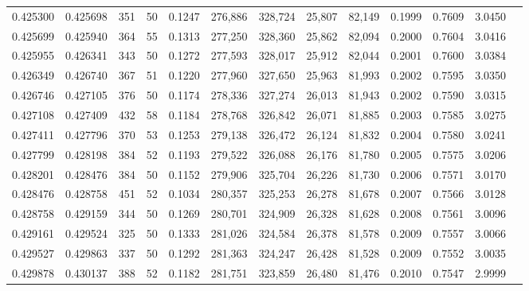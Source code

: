 \begin{tabular}{rrrrrrrrrrrrr}
0.425300 & 0.425698 &   351 &  50 &                                     0.1247 & 276,886 & 328,724 &  25,807 &  82,149 & 0.1999 & 0.7609 & 3.0450 \\
0.425699 & 0.425940 &   364 &  55 &                                     0.1313 & 277,250 & 328,360 &  25,862 &  82,094 & 0.2000 & 0.7604 & 3.0416 \\
0.425955 & 0.426341 &   343 &  50 &                                     0.1272 & 277,593 & 328,017 &  25,912 &  82,044 & 0.2001 & 0.7600 & 3.0384 \\
0.426349 & 0.426740 &   367 &  51 &                                     0.1220 & 277,960 & 327,650 &  25,963 &  81,993 & 0.2002 & 0.7595 & 3.0350 \\
0.426746 & 0.427105 &   376 &  50 &                                     0.1174 & 278,336 & 327,274 &  26,013 &  81,943 & 0.2002 & 0.7590 & 3.0315 \\
0.427108 & 0.427409 &   432 &  58 &                                     0.1184 & 278,768 & 326,842 &  26,071 &  81,885 & 0.2003 & 0.7585 & 3.0275 \\
0.427411 & 0.427796 &   370 &  53 &                                     0.1253 & 279,138 & 326,472 &  26,124 &  81,832 & 0.2004 & 0.7580 & 3.0241 \\
0.427799 & 0.428198 &   384 &  52 &                                     0.1193 & 279,522 & 326,088 &  26,176 &  81,780 & 0.2005 & 0.7575 & 3.0206 \\
0.428201 & 0.428476 &   384 &  50 &                                     0.1152 & 279,906 & 325,704 &  26,226 &  81,730 & 0.2006 & 0.7571 & 3.0170 \\
0.428476 & 0.428758 &   451 &  52 &                                     0.1034 & 280,357 & 325,253 &  26,278 &  81,678 & 0.2007 & 0.7566 & 3.0128 \\
0.428758 & 0.429159 &   344 &  50 &                                     0.1269 & 280,701 & 324,909 &  26,328 &  81,628 & 0.2008 & 0.7561 & 3.0096 \\
0.429161 & 0.429524 &   325 &  50 &                                     0.1333 & 281,026 & 324,584 &  26,378 &  81,578 & 0.2009 & 0.7557 & 3.0066 \\
0.429527 & 0.429863 &   337 &  50 &                                     0.1292 & 281,363 & 324,247 &  26,428 &  81,528 & 0.2009 & 0.7552 & 3.0035 \\
0.429878 & 0.430137 &   388 &  52 &                                     0.1182 & 281,751 & 323,859 &  26,480 &  81,476 & 0.2010 & 0.7547 & 2.9999 \\

\end{tabular}

